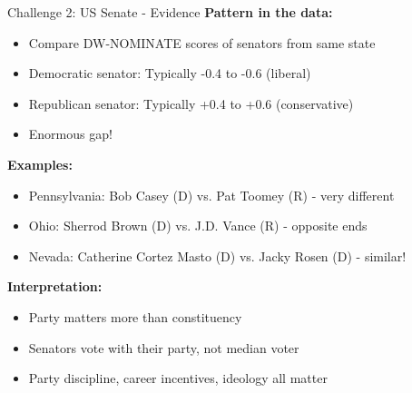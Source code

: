 \documentclass[10pt]{beamer}
\begin{document}
\begin{frame}{Challenge 2: US Senate - Evidence}
\textbf{Pattern in the data:}


\begin{itemize}
\item Compare DW-NOMINATE scores of senators from same state
\item Democratic senator: Typically -0.4 to -0.6 (liberal)
\item Republican senator: Typically +0.4 to +0.6 (conservative)
\item \alert{Enormous gap!}
\end{itemize}



\textbf{Examples:}
\begin{itemize}
\item Pennsylvania: Bob Casey (D) vs. Pat Toomey (R) - very different
\item Ohio: Sherrod Brown (D) vs. J.D. Vance (R) - opposite ends
\item Nevada: Catherine Cortez Masto (D) vs. Jacky Rosen (D) - similar!
\end{itemize}



\textbf{Interpretation:}
\begin{itemize}
\item \alert{Party matters more than constituency}
\item Senators vote with their party, not median voter
\item Party discipline, career incentives, ideology all matter
\end{itemize}
\end{frame}
\end{document}

